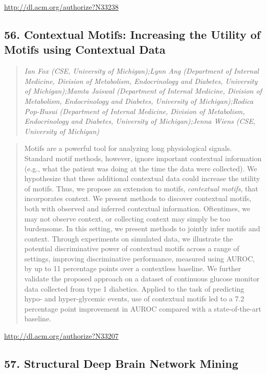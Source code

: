 \documentclass{article}
\begin{document}
\href{http://dl.acm.org/authorize?N33238}{http://dl.acm.org/authorize?N33238}

\subsection{56. Contextual Motifs: Increasing the Utility of Motifs using Contextual Data}

\begin{quote}
\footnotesize{\textit{Ian Fox (CSE, University of Michigan);Lynn Ang (Department of Internal Medicine, Division of Metabolism, Endocrinology and Diabetes, University of Michigan);Mamta Jaiswal (Department of Internal Medicine, Division of Metabolism, Endocrinology and Diabetes, University of Michigan);Rodica Pop-Busui (Department of Internal Medicine, Division of Metabolism, Endocrinology and Diabetes, University of Michigan);Jenna Wiens (CSE, University of Michigan)}}

\end{quote}

\begin{quote}
Motifs are a powerful tool for analyzing long physiological signals. Standard motif methods, however, ignore important contextual information (e.g., what the patient was doing at the time the data were collected). We hypothesize that these additional contextual data could increase the utility of motifs. Thus, we propose an extension to motifs, \textit{contextual motifs}, that incorporates context. We present methods to discover contextual motifs, both with observed and inferred contextual information. Oftentimes, we may not observe context, or collecting context may simply be too burdensome. In this setting, we present methods to jointly infer motifs and context. Through experiments on simulated data, we illustrate the potential discriminative power of contextual motifs across a range of settings, improving discriminative performance, measured using AUROC, by up to 11 percentage points over a contextless baseline. We further validate the proposed approach on a dataset of continuous glucose monitor data collected from type 1 diabetics. Applied to the task of predicting hypo- and hyper-glycemic events, use of contextual motifs led to a 7.2 percentage point improvement in AUROC compared with a state-of-the-art baseline.
\end{quote}

\href{http://dl.acm.org/authorize?N33207}{http://dl.acm.org/authorize?N33207}

\subsection{57. Structural Deep Brain Network Mining}
\end{document}
